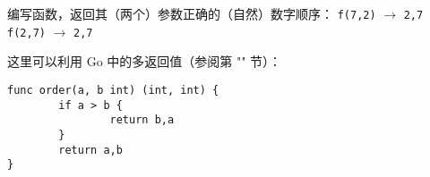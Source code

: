 \begin{Exercise}[title={整数顺序},difficulty=3]
\label{ex:ordering function}
\Question 编写函数，返回其（两个）参数正确的（自然）数字顺序：
\newline 
\lstinline{f(7,2)} $\rightarrow$ \lstinline{2,7}\newline
\lstinline{f(2,7)} $\rightarrow$ \lstinline{2,7}\newline
\end{Exercise}

\begin{Answer}
\Question 
这里可以利用 Go 中的多返回值（参阅第 "" 节）：
\begin{lstlisting}
func order(a, b int) (int, int) {
        if a > b { 
                return b,a 
        }   
        return a,b 
}
\end{lstlisting}

\end{Answer}
